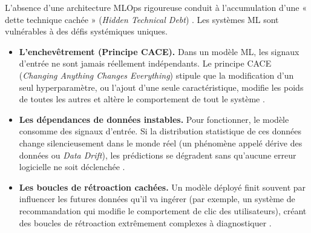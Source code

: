 L'absence d'une architecture MLOps rigoureuse conduit à l'accumulation d'une « dette technique cachée » (\textit{Hidden Technical Debt}) \cite{82}. Les systèmes ML sont vulnérables à des défis systémiques uniques.
\begin{itemize}
    \item[$\bullet$] \textbf{L'enchevêtrement (Principe CACE).} Dans un modèle ML, les signaux d'entrée ne sont jamais réellement indépendants. Le principe CACE (\textit{Changing Anything Changes Everything}) stipule que la modification d'un seul hyperparamètre, ou l'ajout d'une seule caractéristique, modifie les poids de toutes les autres et altère le comportement de tout le système \cite{82}.
    \item[$\bullet$] \textbf{Les dépendances de données instables.} Pour fonctionner, le modèle consomme des signaux d'entrée. Si la distribution statistique de ces données change silencieusement dans le monde réel (un phénomène appelé dérive des données ou \textit{Data Drift}), les prédictions se dégradent sans qu'aucune erreur logicielle ne soit déclenchée \cite{82}.
    \item[$\bullet$] \textbf{Les boucles de rétroaction cachées.} Un modèle déployé finit souvent par influencer les futures données qu'il va ingérer (par exemple, un système de recommandation qui modifie le comportement de clic des utilisateurs), créant des boucles de rétroaction extrêmement complexes à diagnostiquer \cite{82}.
\end{itemize}

